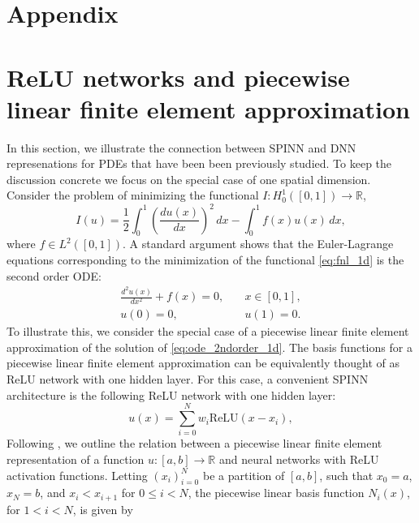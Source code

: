 \documentclass[12pt]{article}
\begin{document}



\newpage
\section*{Appendix}
\appendix

\section{ReLU networks and piecewise linear finite element approximation} \label{app:relu_fem_1d}
In this section, we illustrate the connection between SPINN and DNN represenations for PDEs that have been been previously studied. To keep the discussion concrete we focus on the special case of one spatial dimension. Consider the problem of minimizing the functional $I:H^1_0([0,1]) \to \mathbb{R}$,
\begin{equation} \label{eq:fnl_1d}
I(u) = \frac{1}{2}\int_0^1 \left(\frac{du(x)}{dx}\right)^2 \,dx - \int_0^1 f(x)u(x) \,dx,
\end{equation}
where $f \in L^2([0,1])$. A standard argument shows that the Euler-Lagrange equations corresponding to the minimization of the functional \eqref{eq:fnl_1d} is the second order ODE:
\begin{equation} \label{eq:ode_2ndorder_1d}
\begin{split}
\frac{d^2u(x)}{dx^2} + f(x) = 0, & \quad x \in [0,1],\\
u(0) = 0, & \quad u(1) = 0.
\end{split}
\end{equation}
To illustrate this, we consider the special case of a piecewise linear finite element approximation of the solution of \eqref{eq:ode_2ndorder_1d}. The basis functions for a piecewise linear finite element approximation can be equivalently thought of as ReLU network with one hidden layer. For this case, a convenient SPINN architecture is the following ReLU network with one hidden layer:
\begin{equation} \label{eq:spinn_1d}
u(x) = \sum_{i=0}^N w_i \text{ReLU}(x - x_i),
\end{equation}
Following \cite{HLXZ2020}, we outline the relation between a piecewise linear finite element representation of a function $u:[a,b] \to \mathbb{R}$ and neural networks with ReLU activation functions. Letting $(x_i)_{i=0}^N$ be a partition of $[a,b]$, such that $x_0 = a$, $x_N = b$, and $x_i < x_{i+1}$ for $0 \le i < N$, the piecewise linear basis function $N_i(x)$, for $1 < i < N$, is given by
\end{document}
